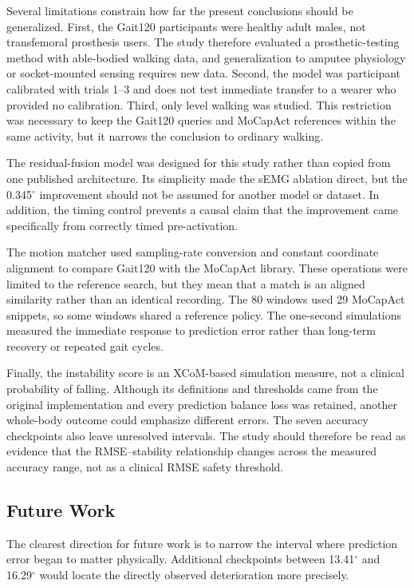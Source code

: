 \documentclass[referee,lineno,pdflatex,sn-vancouver-num]{sn-jnl}
\begin{document}
Several limitations constrain how far the present conclusions should be generalized. First, the Gait120 participants were healthy adult males, not transfemoral prosthesis users. The study therefore evaluated a prosthetic-testing method with able-bodied walking data, and generalization to amputee physiology or socket-mounted sensing requires new data. Second, the model was participant calibrated with trials 1--3 and does not test immediate transfer to a wearer who provided no calibration. Third, only level walking was studied. This restriction was necessary to keep the Gait120 queries and MoCapAct references within the same activity, but it narrows the conclusion to ordinary walking.

The residual-fusion model was designed for this study rather than copied from one published architecture. Its simplicity made the sEMG ablation direct, but the 0.345$^{\circ}$ improvement should not be assumed for another model or dataset. In addition, the timing control prevents a causal claim that the improvement came specifically from correctly timed pre-activation.

The motion matcher used sampling-rate conversion and constant coordinate alignment to compare Gait120 with the MoCapAct library. These operations were limited to the reference search, but they mean that a match is an aligned similarity rather than an identical recording. The 80 windows used 29 MoCapAct snippets, so some windows shared a reference policy. The one-second simulations measured the immediate response to prediction error rather than long-term recovery or repeated gait cycles.

Finally, the instability score is an XCoM-based simulation measure, not a clinical probability of falling. Although its definitions and thresholds came from the original implementation and every prediction balance loss was retained, another whole-body outcome could emphasize different errors. The seven accuracy checkpoints also leave unresolved intervals. The study should therefore be read as evidence that the RMSE--stability relationship changes across the measured accuracy range, not as a clinical RMSE safety threshold.

\subsection{Future Work}

The clearest direction for future work is to narrow the interval where prediction error began to matter physically. Additional checkpoints between 13.41$^{\circ}$ and 16.29$^{\circ}$ would locate the directly observed deterioration more precisely.
\end{document}
